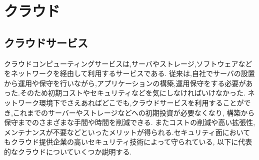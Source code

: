 \section{クラウド}
\subsection{クラウドサービス}
クラウドコンピューティングサービスは,サーバやストレージ,ソフトウェアなどをネットワークを経由して利用するサービスである.
従来は,自社でサーバの設置から運用や保守を行いながら,アプリケーションの構築,運用保守をする必要があった.そのため初期コストやセキュリティなどを気にしなければいけなかった.
ネットワーク環境下でさえあればどこでも,クラウドサービスを利用することができ,これまでのサーバーやストレージなどへの初期投資が必要なくなり,
構築から保守までのさまざまな手間や時間を削減できる.
またコストの削減や高い拡張性,メンテナンスが不要などといったメリットが得られる.セキュリティ面においてもクラウド提供企業の高いセキュリティ技術によって守られている,
以下に代表的なクラウドについていくつか説明する.\\

\renewcommand{\labelenumi}{(\arabic{enumi})}

